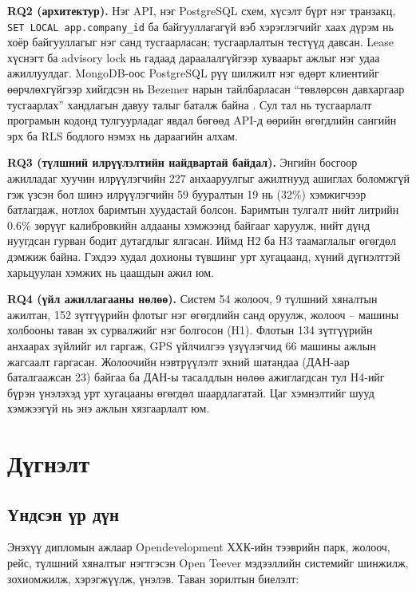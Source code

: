 \documentclass[
12pt,
oneside,
english,
onehalfspacing,
nolistspacing,
headsepline,
]{MUST-Thesis}
\begin{document}
\textbf{RQ2 (архитектур).} Нэг API, нэг PostgreSQL схем, хүсэлт бүрт нэг транзакц, \texttt{SET LOCAL app.company\_id} ба байгууллагагүй вэб хэрэглэгчийг хаах дүрэм нь хоёр байгууллагыг нэг санд тусгаарласан; тусгаарлалтын тестүүд давсан. Lease хүснэгт ба advisory lock нь гадаад дараалалгүйгээр хуваарьт ажлыг нэг удаа ажиллуулдаг. MongoDB-оос PostgreSQL рүү шилжилт нэг өдөрт клиентийг өөрчлөхгүйгээр хийгдсэн нь Bezemer нарын тайлбарласан ``төвлөрсөн давхаргаар тусгаарлах'' хандлагын давуу талыг баталж байна \cite{bezemer2010multitenancy}. Сул тал нь тусгаарлалт програмын кодонд тулгуурладаг явдал бөгөөд API-д өөрийн өгөгдлийн сангийн эрх ба RLS бодлого нэмэх нь дараагийн алхам.

\textbf{RQ3 (түлшний илрүүлэлтийн найдвартай байдал).} Энгийн босгоор ажилладаг хуучин илрүүлэгчийн 227 анхааруулгыг ажилтнууд ашиглах боломжгүй гэж үзсэн бол шинэ илрүүлэгчийн 59 бууралтын 19 нь (32\%) хэмжигчээр батлагдаж, нотлох баримтын хуудастай болсон. Баримтын тулгалт нийт литрийн 0.6\% зөрүүг калибровкийн алдааны хэмжээнд байгааг харуулж, нийт дүнд нуугдсан гурван бодит дутагдлыг ялгасан. Иймд H2 ба H3 таамаглалыг өгөгдөл дэмжиж байна. Гэхдээ худал дохионы түвшинг урт хугацаанд, хүний дүгнэлттэй харьцуулан хэмжих нь цаашдын ажил юм.

\textbf{RQ4 (үйл ажиллагааны нөлөө).} Систем 54 жолооч, 9 түлшний хяналтын ажилтан, 152 зүтгүүрийн флотыг нэг өгөгдлийн санд оруулж, жолооч -- машины холбооны таван эх сурвалжийг нэг болгосон (H1). Флотын 134 зүтгүүрийн анхаарах зүйлийг ил гаргаж, GPS үйлчилгээ үзүүлэгчид 66 машины ажлын жагсаалт гаргасан. Жолоочийн нэвтрүүлэлт эхний шатандаа (ДАН-аар баталгаажсан 23) байгаа ба ДАН-ы тасалдлын нөлөө ажиглагдсан тул H4-ийг бүрэн үнэлэхэд урт хугацааны өгөгдөл шаардлагатай. Цаг хэмнэлтийг шууд хэмжээгүй нь энэ ажлын хязгаарлалт юм.

\chapter{Дүгнэлт}

\section{Үндсэн үр дүн}

Энэхүү дипломын ажлаар Opendevelopment ХХК-ийн тээврийн парк, жолооч, рейс, түлшний хяналтыг нэгтгэсэн Open Teever мэдээллийн системийг шинжилж, зохиомжилж, хэрэгжүүлж, үнэлэв. Таван зорилтын биелэлт:
\end{document}
